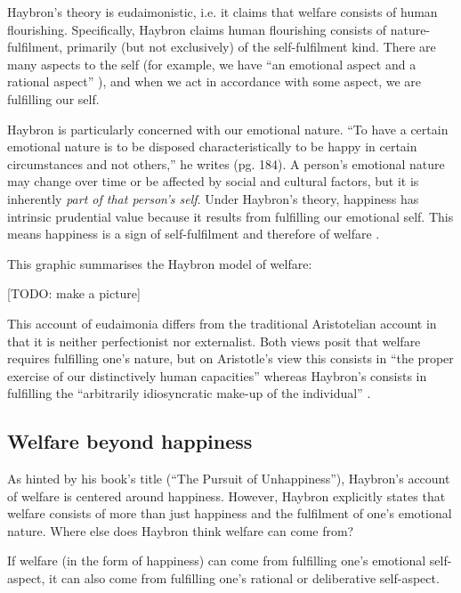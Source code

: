 \documentclass{article}
\begin{document}
Haybron's theory is eudaimonistic, i.e. it claims that welfare consists of human flourishing. Specifically, Haybron claims human flourishing consists of nature-fulfilment, primarily (but not exclusively) of the self-fulfilment kind. There are many aspects to the self (for example, we have ``an emotional aspect and a rational aspect'' \citep[pg. 193]{haybron2008pursuit}), and when we act in accordance with some aspect, we are fulfilling our self.

Haybron is particularly concerned with our emotional nature. ``To have a certain emotional nature is to be disposed characteristically to be happy in certain circumstances and not others,'' he writes (pg. 184). A person's emotional nature may change over time or be affected by social and cultural factors, but it is inherently \textit{part of that person's self}. Under Haybron's theory, happiness has intrinsic prudential value because it results from fulfilling our emotional self. This means happiness is a sign of self-fulfilment and therefore of welfare \citep[pg. 178]{haybron2008pursuit}.

This graphic summarises the Haybron model of welfare:

[TODO: make a picture]

This account of eudaimonia differs from the traditional Aristotelian account in that it is neither perfectionist nor externalist. Both views posit that welfare requires fulfilling one's nature, but on Aristotle's view this consists in ``the proper exercise of our distinctively human capacities'' whereas Haybron's consists in fulfilling the ``arbitrarily idiosyncratic make-up of the individual'' \citep[pg. 193]{haybron2008pursuit}.

\subsection{Welfare beyond happiness}

As hinted by his book's title (``The Pursuit of Unhappiness''), Haybron's account of welfare is centered around happiness. However, Haybron explicitly states that welfare consists of more than just happiness and the fulfilment of one's emotional nature. Where else does Haybron think welfare can come from?

If welfare (in the form of happiness) can come from fulfilling one's emotional self-aspect, it can also come from fulfilling one's rational or deliberative self-aspect. 






\end{document}
